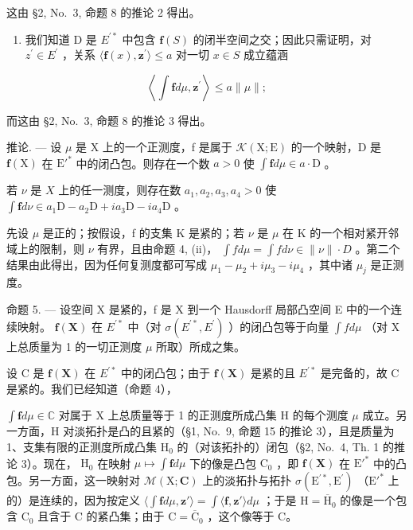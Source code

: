 这由 §2, No.~3, 命题 8 的推论 2 得出。

\begin{enumerate}
\def\labelenumi{(\roman{enumi})}
\setcounter{enumi}{1}
\tightlist
\item
  我们知道 D 是 \(E^{\prime*}\) 中包含 \(\mathbf{f}(S)\) 的闭半空间之交；因此只需证明，对 \(z^{\prime} \in E^{\prime}\) ，关系 \(\langle\mathbf{f}(x), \mathbf{z}^{\prime}\rangle \leqslant a\) 对一切 \(x \in S\) 成立蕴涵
\end{enumerate}

\[
\left\langle \int \mathbf {f} d \mu , \mathbf {z} ^ {\prime} \right\rangle \leqslant a \| \mu \|;
\]

而这由 §2, No.~3, 命题 8 的推论 3 得出。

推论. --- 设 \(\mu\) 是 X 上的一个正测度，f 是属于 \(\mathcal{K}(\mathrm{X};\mathrm{E})\) 的一个映射，D 是 \(\mathbf{f}(\mathrm{X})\) 在 \(\mathrm{E}'^*\) 中的闭凸包。则存在一个数 \(a > 0\) 使 \(\int \mathbf{f} d\mu \in a \cdot \mathrm{D}\) 。

若 \(\nu\) 是 \(X\) 上的任一测度，则存在数 \(a_1, a_2, a_3, a_4 > 0\) 使 \(\int \mathbf{f} d\nu \in a_1\mathrm{D} - a_2\mathrm{D} + ia_3\mathrm{D} - ia_4\mathrm{D}\) 。

先设 \(\mu\) 是正的；按假设，f 的支集 K 是紧的；若 \(\nu\) 是 \(\mu\) 在 K 的一个相对紧开邻域上的限制，则 \(\nu\) 有界，且由命题 4, (ii)， \(\int f d\mu = \int f d\nu \in \|\nu\| \cdot D\) 。第二个结果由此得出，因为任何复测度都可写成 \(\mu_{1} - \mu_{2} + i\mu_{3} - i\mu_{4}\) ，其中诸 \(\mu_{j}\) 是正测度。

命题 5. --- 设空间 X 是紧的，f 是 X 到一个 Hausdorff 局部凸空间 E 中的一个连续映射。 \(\mathbf{f}(\mathbf{X})\) 在 \(E^{\prime*}\) 中（对 \(\sigma(E^{\prime*}, E^{\prime})\) ）的闭凸包等于向量 \(\int f d\mu\) （对 X 上总质量为 1 的一切正测度 \(\mu\) 所取）所成之集。

设 C 是 \(\mathbf{f}(\mathbf{X})\) 在 \(E^{\prime*}\) 中的闭凸包；由于 \(\mathbf{f}(\mathbf{X})\) 是紧的且 \(E^{\prime*}\) 是完备的，故 C 是紧的。我们已经知道（命题 4），

\(\int \mathbf{f}d\mu \in \mathbb{C}\) 对属于 X 上总质量等于 1 的正测度所成凸集 H 的每个测度 \(\mu\) 成立。另一方面，H 对淡拓扑是凸的且紧的（§1, No.~9, 命题 15 的推论 3），且是质量为 1、支集有限的正测度所成凸集 \(\mathrm{H}_0\) 的（对该拓扑的）闭包（§2, No.~4, Th. 1 的推论 3）。现在， \(\mathrm{H}_0\) 在映射 \(\mu \mapsto \int \mathbf{f}d\mu\) 下的像是凸包 \(\mathrm{C}_0\) ，即 \(\mathbf{f}(\mathbf{X})\) 在 \(\mathrm{E}'^*\) 中的凸包。另一方面，这一映射对 \(\mathcal{M}(\mathrm{X};\mathbf{C})\) 上的淡拓扑与拓扑 \(\sigma (\mathrm{E}^{\prime *},\mathrm{E}^{\prime})\) （\(\mathrm{E}'^*\) 上的）是连续的，因为按定义 \(\langle \int \mathbf{f}d\mu ,\mathbf{z}'\rangle = \int \langle \mathbf{f},\mathbf{z}'\rangle d\mu\) ；于是 \(\mathrm{H} = \overline{\mathrm{H}}_0\) 的像是一个包含 \(\mathrm{C}_0\) 且含于 C 的紧凸集；由于 \(\mathrm{C} = \overline{\mathrm{C}}_0\) ，这个像等于 C。


